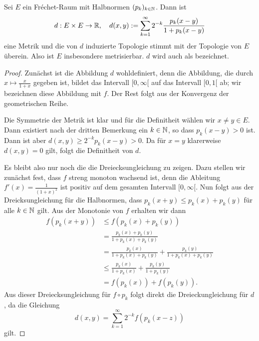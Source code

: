 \begin{prop}
  \label{prop:frechet-metrik}
  Sei $E$ ein Fr\'echet-Raum mit Halbnormen $(p_k)_{k \in \mathbb{N}}$. Dann
  ist
  \[
  d: E \times E \rightarrow \mathbb{R}, \quad d(x,y) := \sum_{k=1}^\infty 2^{-k}
  \frac{p_k(x-y)}{1 + p_k(x-y)}
  \]
  eine Metrik und die von $d$ induzierte Topologie stimmt mit der
  Topologie von $E$ überein. Also ist $E$ insbesondere
  metrisierbar. $d$ wird auch als  bezeichnet.
\end{prop}

\begin{proof}
  Zunächst ist die Abbildung $d$ wohldefiniert, denn die Abbildung,
  die durch $x \mapsto \frac{x}{1+x}$ gegeben ist, bildet das
  Intervall $[0, \infty[$ auf das Intervall $[0,1[$ ab; wir bezeichnen
  diese Abbildung mit $f$. Der Rest folgt
  aus der Konvergenz der geometrischen Reihe.

  Die Symmetrie der Metrik ist klar und für die Definitheit wählen wir
  $x\neq y \in E$. Dann existiert nach der dritten Bemerkung ein $k \in
  \mathbb{N}$, so dass $p_k(x-y) >0$ ist. Dann ist aber $d(x,y) \geq
  2^{-k}p_k(x-y) > 0$. Da für $x =y$ klarerweise $d(x,y) =0$ gilt,
  folgt die Definitheit von $d$.

  Es bleibt also nur noch die die
  Dreiecksungleichung zu zeigen. Dazu stellen wir zunächst fest, dass
  $f$ streng monoton wachsend ist, denn die Ableitung $f'(x) =
  \frac{1}{(1+x)^2}$ ist positiv auf dem gesamten Intervall $[0,
  \infty[$. Nun folgt aus der Dreicksungleichung für die Halbnormen,
  dass $p_k(x+y) \leq p_k(x) + p_k(y)$ für alle $k \in \mathbb{N}$ gilt. Aus
  der Monotonie von $f$ erhalten wir dann
  \begin{align*}
    f(p_k(x+y)) & \leq f(p_k(x) + p_k(y)) \\
    & = \frac{ p_k(x) + p_k(y)}{1 + p_k(x) + p_k(y)}\\
    & = \frac{p_k(x)}{1+ p_k(x)+p_k(y)} + \frac{p_k(y)}{1+p_k(x) +
      p_k(y)} \\
    & \leq \frac{p_k(x)}{1+p_k(x)} + \frac{p_k(y)}{1+ p_k(y)} \\
    & = f(p_k(x)) + f(p_k(y)).
  \end{align*}
  Aus dieser Dreiecksungleichung für $f \circ p_k$ folgt direkt die
  Dreieckungleichung für $d$, da die Gleichung
  \[
  d(x,y) = \sum_{k=1}^\infty 2^{-k}f(p_k(x-z))
  \]
  gilt.
  

\end{proof}
